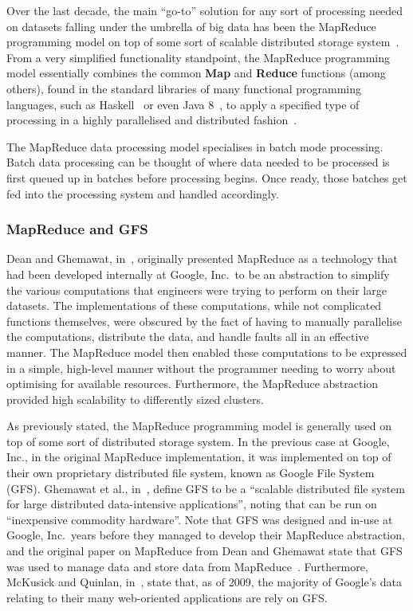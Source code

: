 \documentclass[a4paper,11pt]{article}
\begin{document}
Over the last decade, the main ``go-to'' solution for any sort of processing needed on datasets falling under the
umbrella of big data has been the MapReduce programming model on top of some sort of scalable distributed storage
system~\cite{bifet_mining_2013}. From a very simplified functionality standpoint, the MapReduce programming model essentially
combines the common \textbf{Map} and \textbf{Reduce} functions (among others), found in the standard libraries of many functional
programming languages, such as Haskell~\cite{lammel2008google} or even Java 8~\cite{su2014changing}, to apply a specified
type of processing in a highly parallelised and distributed fashion~\cite{yang2007map}.

The MapReduce data processing model specialises in batch mode processing. Batch data processing can be thought of where
data needed to be processed is first queued up in batches before processing begins. Once ready, those batches get fed
into the processing system and handled accordingly. %

\subsubsection{MapReduce and GFS} %
\label{ssub:mapreduce_and_gfs}

Dean and Ghemawat, in~\cite{dean_mapreduce:_2008}, originally presented MapReduce as a technology that had been
developed internally at Google, Inc.\ to be an abstraction to simplify the various computations that engineers were
trying to perform on their large datasets. The implementations of these computations, while not complicated functions
themselves, were obscured by the fact of having to manually parallelise the computations, distribute the data, and
handle faults all in an effective manner. The MapReduce model then enabled these computations to be expressed in a
simple, high-level manner without the programmer needing to worry about optimising for available resources. Furthermore,
the MapReduce abstraction provided high scalability to differently sized clusters.

As previously stated, the MapReduce programming model is generally used on top of some sort of distributed storage
system. In the previous case at Google, Inc., in the original MapReduce implementation, it was implemented on top of
their own proprietary distributed file system, known as Google File System (GFS). Ghemawat et al.,
in~\cite{ghemawat_google_2003}, define GFS to be a ``scalable distributed file system for large distributed data-intensive
applications'', noting that can be run on ``inexpensive commodity hardware''. Note that GFS was designed and in-use
at Google, Inc.\ years before they managed to develop their MapReduce abstraction, and the original paper on MapReduce
from Dean and Ghemawat state that GFS was used to manage data and store data from MapReduce~\cite{dean_mapreduce:_2008}.
Furthermore, McKusick and Quinlan, in~\cite{mckusick2009gfs}, state that, as of 2009, the majority of Google's data
relating to their many web-oriented applications are rely on GFS.
\end{document}
